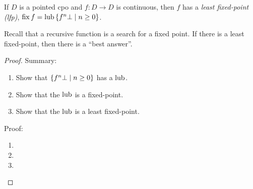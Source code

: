 \documentclass{article}
\begin{document}
\begin{theorem}
  If $D$ is a pointed cpo and $f:D\rightarrow D$ is continuous, then $f$ has a \emph{least fixed-point (lfp)}, $\operatorname{fix}{f} = \operatorname{lub}{\{f^n\bot\mid n\geq 0\}}$.
\end{theorem}

\noindent Recall that a recursive function is a search for a fixed point. If
there is a least fixed-point, then there is a ``best answer''.

\begin{proof}
Summary:
\begin{enumerate}
  \item Show that $\{f^n\bot\mid n\geq 0\}$ has a $\operatorname{lub}$.
  \item Show that the $\operatorname{lub}$ is a fixed-point.
  \item Show that the $\operatorname{lub}$ is a least fixed-point.
\end{enumerate}
Proof:
\begin{enumerate}
\item
\item
\item
\end{enumerate}
\end{proof}
\end{document}
